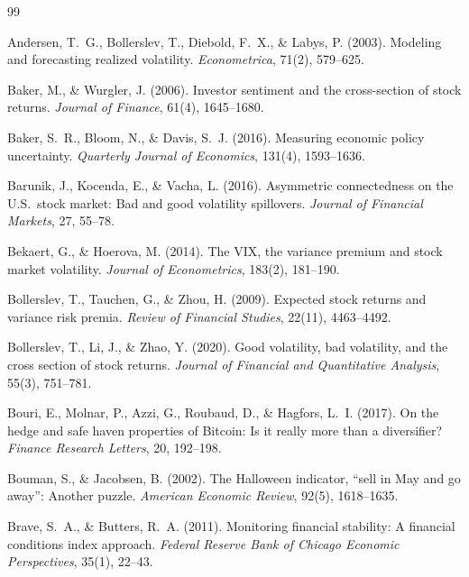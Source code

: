 \documentclass[12pt,a4paper]{article}
\begin{document}
\newpage

\begin{thebibliography}{99}

Andersen, T.~G., Bollerslev, T., Diebold, F.~X., \& Labys, P. (2003). Modeling and forecasting realized volatility. \textit{Econometrica}, 71(2), 579--625.

Baker, M., \& Wurgler, J. (2006). Investor sentiment and the cross-section of stock returns. \textit{Journal of Finance}, 61(4), 1645--1680.

Baker, S.~R., Bloom, N., \& Davis, S.~J. (2016). Measuring economic policy uncertainty. \textit{Quarterly Journal of Economics}, 131(4), 1593--1636.

Barunik, J., Kocenda, E., \& Vacha, L. (2016). Asymmetric connectedness on the U.S.\ stock market: Bad and good volatility spillovers. \textit{Journal of Financial Markets}, 27, 55--78.

Bekaert, G., \& Hoerova, M. (2014). The VIX, the variance premium and stock market volatility. \textit{Journal of Econometrics}, 183(2), 181--190.

Bollerslev, T., Tauchen, G., \& Zhou, H. (2009). Expected stock returns and variance risk premia. \textit{Review of Financial Studies}, 22(11), 4463--4492.

Bollerslev, T., Li, J., \& Zhao, Y. (2020). Good volatility, bad volatility, and the cross section of stock returns. \textit{Journal of Financial and Quantitative Analysis}, 55(3), 751--781.

Bouri, E., Molnar, P., Azzi, G., Roubaud, D., \& Hagfors, L.~I. (2017). On the hedge and safe haven properties of Bitcoin: Is it really more than a diversifier? \textit{Finance Research Letters}, 20, 192--198.

Bouman, S., \& Jacobsen, B. (2002). The Halloween indicator, ``sell in May and go away'': Another puzzle. \textit{American Economic Review}, 92(5), 1618--1635.

Brave, S.~A., \& Butters, R.~A. (2011). Monitoring financial stability: A financial conditions index approach. \textit{Federal Reserve Bank of Chicago Economic Perspectives}, 35(1), 22--43.


\end{thebibliography}
\end{document}
